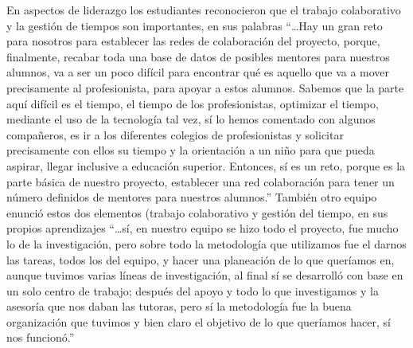 \documentclass[spanish]{textolivre}
\begin{document}
En aspectos de liderazgo los estudiantes reconocieron que el trabajo colaborativo y la gestión de tiempos son importantes, en sus palabras “…Hay un gran reto para nosotros para establecer las redes de colaboración del proyecto, porque, finalmente, recabar toda una base de datos de posibles mentores para nuestros alumnos, va a ser un poco difícil para encontrar qué es aquello que va a mover precisamente al profesionista, para apoyar a estos alumnos. Sabemos que la parte aquí difícil es el tiempo, el tiempo de los profesionistas, optimizar el tiempo, mediante el uso de la tecnología tal vez, sí lo hemos comentado con algunos compañeros, es ir a los diferentes colegios de profesionistas y solicitar precisamente con ellos su tiempo y la orientación a un niño para que pueda aspirar, llegar inclusive a educación superior. Entonces, sí es un reto, porque es la parte básica de nuestro proyecto, establecer una red colaboración para tener un número definidos de mentores para nuestros alumnos.” También otro equipo enunció estos dos elementos (trabajo colaborativo y gestión del tiempo, en sus propios aprendizajes “…sí, en nuestro equipo se hizo todo el proyecto, fue mucho lo de la investigación, pero sobre todo la metodología que utilizamos fue el darnos las tareas, todos los del equipo, y hacer una planeación de lo que queríamos en, aunque tuvimos varias líneas de investigación, al final sí se desarrolló con base en un solo centro de trabajo; después del apoyo y todo lo que investigamos y la asesoría que nos daban las tutoras, pero sí la metodología fue la buena organización que tuvimos y bien claro el objetivo de lo que queríamos hacer, sí nos funcionó.”
\end{document}
